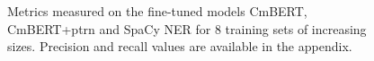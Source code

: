 \begin{figure}[ht!]
	  \caption{\label{fig:f1-vs-trainsize} Metrics measured on the fine-tuned models CmBERT, CmBERT+ptrn and SpaCy NER for 8 training sets of increasing sizes. Precision and recall values are available in the appendix.}
\end{figure}
	                                        

